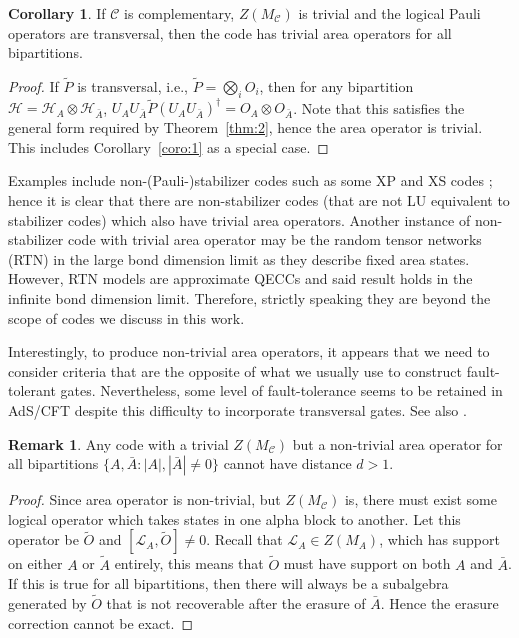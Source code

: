 \documentclass[%
 reprint,
superscriptaddress,
nofootinbib,
 amsmath,amssymb,
 aps,
prx,
floatfix,
]{revtex4-2}
\theoremstyle{definition}
\newtheorem{remark}[section]{Remark}
\newtheorem{corollary}{Corollary}[section]
\numberwithin{equation}{section}
\begin{document}
\begin{corollary}
If $\mathcal{C}$ is complementary, $Z(M_{\mathcal{C}})$ is trivial and the logical Pauli operators are transversal, then the code has trivial area operators for all bipartitions.
\end{corollary}
\begin{proof}
    If $\tilde{P}$ is transversal, i.e., $\tilde{P}=\bigotimes_i O_i$, then for any bipartition $\mathcal{H}=\mathcal{H}_A\otimes \mathcal{H}_{\bar{A}}$, $U_{A}U_{\bar{A}} \tilde{P} (U_{A}U_{\bar{A}})^{\dagger} = O_{A}\otimes O_{\bar{A}}$. Note that this satisfies the general form required by Theorem~\ref{thm:2}, hence the area operator is trivial. This includes Corollary~\ref{coro:1} as a special case.
\end{proof}
Examples include non-(Pauli-)stabilizer codes such as some XP and XS codes \cite{XP,XS}; hence it is clear that there are non-stabilizer codes (that are not LU equivalent to stabilizer codes) which also have trivial area operators.  Another instance of non-stabilizer code with trivial area operator may be the random tensor networks (RTN) in the large bond dimension limit\cite{Hayden:2016cfa} as they describe fixed area states\cite{Akers:2018fow,Dong:2018seb}. However, RTN models are approximate QECCs and said result holds in the infinite bond dimension limit. Therefore, strictly speaking they are beyond the scope of codes we discuss in this work. 

Interestingly, to produce non-trivial area operators, it appears that we need to consider criteria that are the opposite of what we usually use to construct fault-tolerant gates. Nevertheless, some level of fault-tolerance seems to be retained  in AdS/CFT \cite{threshold} despite this difficulty to incorporate transversal gates. See also \cite{Woods,Faist,Cree:2021rxi}. 

\begin{remark}\label{rmk:erasure}
Any code with a trivial $Z(M_{\mathcal{C}})$ but a non-trivial area operator for all bipartitions 
 $\{A,\bar{A}: |A|,|\bar{A}|\ne 0\}$ cannot have distance $d>1$.
\end{remark}
\begin{proof}
Since area operator is non-trivial, but $Z(M_{\mathcal{C}})$ is, there must exist some logical operator which takes states in one alpha block to another. Let this operator be $\tilde{O}$ and $[\mathcal{L}_A,\tilde{O}]\ne 0$. Recall that $\mathcal{L}_A\in Z(M_A)$, which has support on either $A$ or $\tilde{A}$ entirely, this means that $\tilde{O}$ must have support on both $A$ and $\bar{A}$. If this is true for all bipartitions, then there will always be a subalgebra generated by $\tilde{O}$ that is not recoverable after the erasure of $\bar{A}$. Hence the erasure correction cannot be exact. 
\end{proof}
\end{document}
